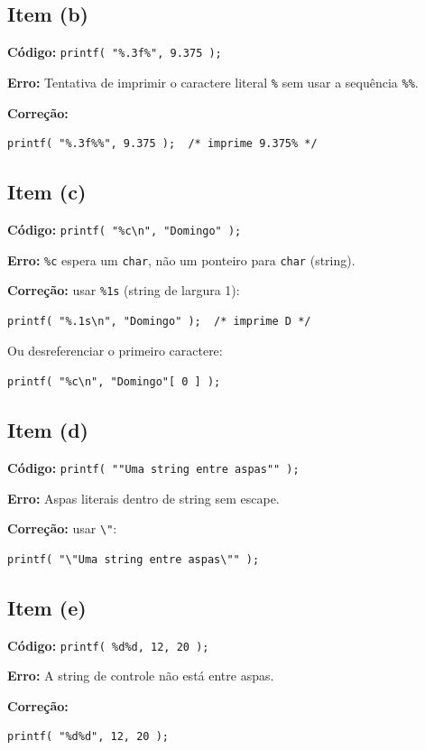 \documentclass[12pt,a4paper]{article}
\begin{document}
\subsection*{Item (b)}
\begin{respostabox}
\textbf{Código:} \texttt{printf( "\%.3f\%", 9.375 );}

\textbf{Erro:} Tentativa de imprimir o caractere literal \texttt{\%} sem usar a
sequência \texttt{\%\%}.

\textbf{Correção:}
\begin{lstlisting}
printf( "%.3f%%", 9.375 );  /* imprime 9.375% */
\end{lstlisting}
\end{respostabox}

\subsection*{Item (c)}
\begin{respostabox}
\textbf{Código:} \texttt{printf( "\%c\textbackslash n", "Domingo" );}

\textbf{Erro:} \texttt{\%c} espera um \texttt{char}, não um ponteiro para \texttt{char}
(string).

\textbf{Correção:} usar \texttt{\%1s} (string de largura 1):
\begin{lstlisting}
printf( "%.1s\n", "Domingo" );  /* imprime D */
\end{lstlisting}
Ou desreferenciar o primeiro caractere:
\begin{lstlisting}
printf( "%c\n", "Domingo"[ 0 ] );
\end{lstlisting}
\end{respostabox}

\subsection*{Item (d)}
\begin{respostabox}
\textbf{Código:} \texttt{printf( ""Uma string entre aspas"" );}

\textbf{Erro:} Aspas literais dentro de string sem escape.

\textbf{Correção:} usar \texttt{\textbackslash "}:
\begin{lstlisting}
printf( "\"Uma string entre aspas\"" );
\end{lstlisting}
\end{respostabox}

\subsection*{Item (e)}
\begin{respostabox}
\textbf{Código:} \texttt{printf( \%d\%d, 12, 20 );}

\textbf{Erro:} A string de controle não está entre aspas.

\textbf{Correção:}
\begin{lstlisting}
printf( "%d%d", 12, 20 );
\end{lstlisting}
\end{respostabox}
\end{document}
